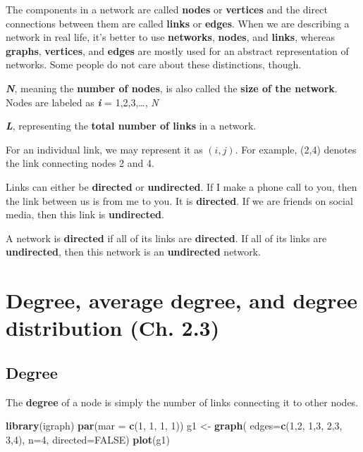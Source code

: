 \documentclass[
]{krantz}
\makeatletter
\newenvironment{Shaded}{\begin{snugshade}}{\end{snugshade}}
\newcommand{\DataTypeTok}[1]{\textcolor[rgb]{0.27,0.27,0.27}{#1}}
\newcommand{\DecValTok}[1]{\textcolor[rgb]{0.06,0.06,0.06}{#1}}
\newcommand{\KeywordTok}[1]{\textcolor[rgb]{0.27,0.27,0.27}{\textbf{#1}}}
\newcommand{\NormalTok}[1]{#1}
\newcommand{\OtherTok}[1]{\textcolor[rgb]{0.37,0.37,0.37}{#1}}
\newcommand{\StringTok}[1]{\textcolor[rgb]{0.5,0.5,0.5}{#1}}
\newenvironment{kframe}{%
\medskip{}
\setlength{\fboxsep}{.8em}
 \def\at@end@of@kframe{}%
 \ifinner\ifhmode%
  \def\at@end@of@kframe{\end{minipage}}%
  \begin{minipage}{\columnwidth}%
 \fi\fi%
 \def\FrameCommand##1{\hskip\@totalleftmargin \hskip-\fboxsep
 \colorbox{shadecolor}{##1}\hskip-\fboxsep
     \hskip-\linewidth \hskip-\@totalleftmargin \hskip\columnwidth}%
 \MakeFramed {\advance\hsize-\width
   \@totalleftmargin\z@ \linewidth\hsize
   \@setminipage}}%
 {\par\unskip\endMakeFramed%
 \at@end@of@kframe}
\renewenvironment{Shaded}{\begin{kframe}}{\end{kframe}}
\makeatother
\begin{document}
The components in a network are called \textbf{nodes} or \textbf{vertices} and the direct connections between them are called \textbf{links} or \textbf{edges}. When we are describing a network in real life, it's better to use \textbf{networks}, \textbf{nodes}, and \textbf{links}, whereas \textbf{graphs}, \textbf{vertices}, and \textbf{edges} are mostly used for an abstract representation of networks. Some people do not care about these distinctions, though.

\textbf{\emph{N}}, meaning the \textbf{number of nodes}, is also called the \textbf{size of the network}. Nodes are labeled as \textbf{\emph{i}} = 1,2,3,\ldots, \emph{N}

\textbf{\emph{L}}, representing the \textbf{total number of links} in a network.

For an individual link, we may represent it as \((i, j)\). For example, (2,4) denotes the link connecting nodes 2 and 4.

Links can either be \textbf{directed} or \textbf{undirected}. If I make a phone call to you, then the link between us is from me to you. It is \textbf{directed}. If we are friends on social media, then this link is \textbf{undirected}.

A network is \textbf{directed} if all of its links are \textbf{directed}. If all of its links are \textbf{undirected}, then this network is an \textbf{undirected} network.

\hypertarget{degree-average-degree-and-degree-distribution-ch.-2.3}{%
\section{Degree, average degree, and degree distribution (Ch. 2.3)}\label{degree-average-degree-and-degree-distribution-ch.-2.3}}

\hypertarget{degree}{%
\subsection{Degree}\label{degree}}

The \textbf{degree} of a node is simply the number of links connecting it to other nodes.

\begin{Shaded}
\begin{Highlighting}[]
\KeywordTok{library}\NormalTok{(igraph)}
\KeywordTok{par}\NormalTok{(}\DataTypeTok{mar =} \KeywordTok{c}\NormalTok{(}\DecValTok{1}\NormalTok{, }\DecValTok{1}\NormalTok{, }\DecValTok{1}\NormalTok{, }\DecValTok{1}\NormalTok{))}
\NormalTok{g1 <-}\StringTok{ }\KeywordTok{graph}\NormalTok{( }\DataTypeTok{edges=}\KeywordTok{c}\NormalTok{(}\DecValTok{1}\NormalTok{,}\DecValTok{2}\NormalTok{, }\DecValTok{1}\NormalTok{,}\DecValTok{3}\NormalTok{, }\DecValTok{2}\NormalTok{,}\DecValTok{3}\NormalTok{, }\DecValTok{3}\NormalTok{,}\DecValTok{4}\NormalTok{), }\DataTypeTok{n=}\DecValTok{4}\NormalTok{, }\DataTypeTok{directed=}\OtherTok{FALSE}\NormalTok{)}
\KeywordTok{plot}\NormalTok{(g1)}
\end{Highlighting}
\end{Shaded}
\end{document}
